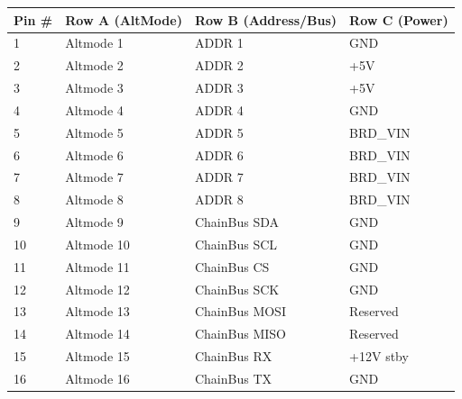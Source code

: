 \documentclass[b5paper, 10pt, twoside]{book}
\begin{document}
\begin{table}[H]
  \centering
  \small
  \begin{tabular}{@{}llll@{}}
    \toprule
    \textbf{Pin \#} & \textbf{Row A (AltMode)} & \textbf{Row B (Address/Bus)} & \textbf{Row C (Power)} \\ \midrule
    1               & Altmode 1                & ADDR 1                       & GND                    \\
    2               & Altmode 2                & ADDR 2                       & +5V                    \\
    3               & Altmode 3                & ADDR 3                       & +5V                    \\
    4               & Altmode 4                & ADDR 4                       & GND                    \\
    5               & Altmode 5                & ADDR 5                       & BRD\_VIN               \\
    6               & Altmode 6                & ADDR 6                       & BRD\_VIN               \\
    7               & Altmode 7                & ADDR 7                       & BRD\_VIN               \\
    8               & Altmode 8                & ADDR 8                       & BRD\_VIN               \\
    9               & Altmode 9                & ChainBus SDA                 & GND                    \\
    10              & Altmode 10               & ChainBus SCL                 & GND                    \\
    11              & Altmode 11               & ChainBus CS                  & GND                    \\
    12              & Altmode 12               & ChainBus SCK                 & GND                    \\
    13              & Altmode 13               & ChainBus MOSI                & Reserved               \\
    14              & Altmode 14               & ChainBus MISO                & Reserved               \\
    15              & Altmode 15               & ChainBus RX                  & +12V stby              \\
    16              & Altmode 16               & ChainBus TX                  & GND                    \\ \bottomrule
  \end{tabular}
\end{table}
\end{document}
